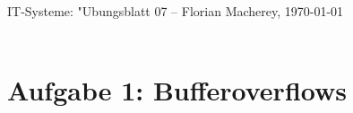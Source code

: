 \documentclass{scrartcl}
\begin{document}
{\Large \centering \textsf{IT-Systeme: "Ubungsblatt 07} -- Florian Macherey, 
\today}\\
\noindent\makebox[\linewidth]{\rule{\textwidth}{0.2pt}} \\


\section*{Aufgabe 1: Bufferoverflows}
\end{document}
